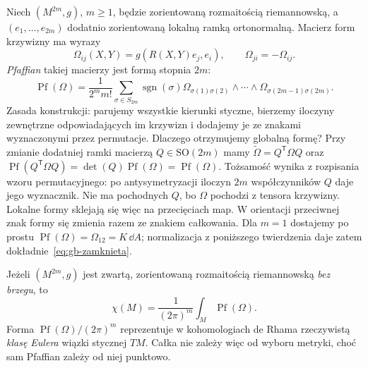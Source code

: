 Niech $(M^{2m},g)$, $m\geq1$, będzie zorientowaną rozmaitością
riemannowską, a $(e_1,\ldots,e_{2m})$ dodatnio zorientowaną
lokalną ramką ortonormalną. Macierz form krzywizny ma wyrazy
\[
 \Omega_{ij}(X,Y)=g(R(X,Y)e_j,e_i),\qquad
 \Omega_{ji}=-\Omega_{ij}.
\]
\emph{Pfaffian} takiej macierzy jest formą stopnia $2m$:
\begin{equation}\label{eq:gb-pfaff-def}
 \operatorname{Pf}(\Omega)=\frac1{2^m m!}
 \sum_{\sigma\in S_{2m}}\operatorname{sgn}(\sigma)
 \Omega_{\sigma(1)\sigma(2)}\wedge\cdots\wedge
 \Omega_{\sigma(2m-1)\sigma(2m)}.
\end{equation}
Zasada konstrukcji: parujemy wszystkie kierunki styczne,
bierzemy iloczyny zewnętrzne odpowiadających im krzywizn
i dodajemy je ze znakami wyznaczonymi przez permutacje.
Dlaczego otrzymujemy globalną formę? Przy zmianie dodatniej
ramki macierzą $Q\in\mathrm{SO}(2m)$ mamy
$\widetilde\Omega=Q^{\mathsf T}\Omega Q$ oraz
$\operatorname{Pf}(Q^{\mathsf T}\Omega Q)
=\det(Q)\operatorname{Pf}(\Omega)=\operatorname{Pf}(\Omega)$.
Tożsamość wynika z rozpisania wzoru permutacyjnego:
po antysymetryzacji iloczyn $2m$ współczynników $Q$
daje jego wyznacznik. Nie ma pochodnych $Q$, bo
$\Omega$ pochodzi z tensora krzywizny. Lokalne formy
sklejają się więc na przecięciach map.
W orientacji przeciwnej znak formy się zmienia razem
ze znakiem całkowania. Dla $m=1$ dostajemy po prostu
$\operatorname{Pf}(\Omega)=\Omega_{12}=K\,\dd A$;
normalizacja z poniższego twierdzenia daje zatem
dokładnie~\eqref{eq:gb-zamknieta}.

\begin{twierdzenie}
\label{thm:chern-gauss-bonnet}
Jeżeli $(M^{2m},g)$ jest zwartą, zorientowaną
rozmaitością riemannowską \emph{bez brzegu}, to
\begin{equation}\label{eq:chern-gauss-bonnet}
 \boxed{\displaystyle
 \chi(M)=\frac1{(2\pi)^m}\int_M
                       \operatorname{Pf}(\Omega).}
\end{equation}
Forma $\operatorname{Pf}(\Omega)/(2\pi)^m$ reprezentuje
w kohomologiach de Rhama rzeczywistą \emph{klasę Eulera}
wiązki stycznej $TM$. Całka nie zależy więc od wyboru
metryki, choć sam Pfaffian zależy od niej punktowo.
\end{twierdzenie}

